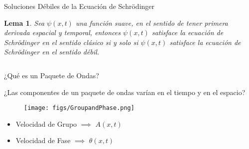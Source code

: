 \documentclass[aspectratio=1610]{beamer}
\newtheorem*{lem}{Lema}
\begin{document}
\begin{frame}{Soluciones Débiles de la Ecuación de Schrödinger}
   
\begin{lem}
    Sea $\psi(x,t)$ una función suave, en el sentido de tener primera derivada espacial y temporal, entonces $\psi(x,t)$ satisface la ecuación de Schrödinger en el sentido clásico si y solo si $\psi(x,t)$ satisface la ecuación de Schrödinger en el sentido débil.
\end{lem}   
    
\begin{columns}
\column{37em}
\end{columns}
\end{frame}


\begin{frame}{¿Qué es un Paquete de Ondas?}
   
¿Las componentes de un paquete de ondas varían en el tiempo y en el espacio?
\begin{figure}[h]
    \centering
    \texttt{[image: figs/GroupandPhase.png]}
\end{figure}
\begin{itemize}\itemsep1em
    \item \textcolor{}{Velocidad de Grupo $\implies$ $A(x,t)$}
    \item \textcolor{}{Velocidad de Fase $\implies$ $\theta(x,t)$}
\end{itemize}
    
\begin{columns}
\column{37em}
\end{columns}
\end{frame}
\end{document}
